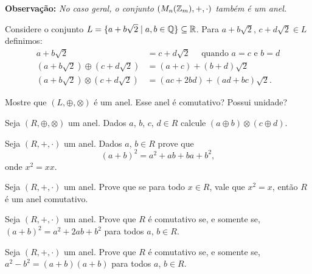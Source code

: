 \documentclass[12pt]{exam}
\begin{document}
    \vspace{.2cm}

    \textbf{Observação: }\textit{No caso geral, o conjunto $(M_n(\mathbb{Z}_m), + , \cdot)$ também é um anel.}

    \vspace{.3cm}

    \questao{} Considere o conjunto $L = \{ a + b\sqrt{2} \mid a, b \in \mathbb{Q}\} \subseteq \mathbb{R}$. Para $a + b\sqrt{2}$, $c + d\sqrt{2} \in L$ definimos:
    \begin{align*}
        a + b\sqrt{2} &= c + d\sqrt{2} \quad \mbox{ quando } a = c \mbox{ e } b = d\\
        (a + b\sqrt{2}) \oplus (c + d\sqrt{2}) &= (a + c) + (b + d)\sqrt{2}\\
        (a + b\sqrt{2}) \otimes (c + d\sqrt{2}) &= (ac + 2bd) + (ad + bc)\sqrt{2}.
    \end{align*}

    Mostre que $(L, \oplus, \otimes)$ \'e um anel. Esse anel \'e comutativo? Possui unidade?

    \vspace{.3cm}

    \questao{} Seja $(R, \oplus, \otimes)$ um anel. Dados $a$, $b$, $c$, $d \in R$ calcule $(a \oplus b)\otimes (c \oplus d)$.

    \vspace{.3cm}

    \questao{} Seja $(R, +, \cdot)$ um anel. Dados $a$, $b \in R$ prove que
    \[
        (a + b)^2 = a^2 + ab + ba + b^2,
    \]
    onde $x^2 = xx$.

    \vspace{.3cm}

    \questao{} Seja $(R, +, \cdot)$ um anel. Prove que se para todo $x \in R$, vale que $x^2 = x$, então $R$ é um anel comutativo.

    \vspace{.3cm}

    \questao{} Seja $(R, +, \cdot)$ um anel. Prove que $R$ é comutativo se, e somente se, $(a + b)^2 = a^2 + 2ab + b^2$ para todos $a$, $b \in R$.

    \vspace{.3cm}

    \questao{} Seja $(R, +, \cdot)$ um anel. Prove que $R$ é comutativo se, e somente se, $a^2 - b^2 = (a + b)(a + b)$ para todos $a$, $b \in R$.

    \vspace{.3cm}
\end{document}
